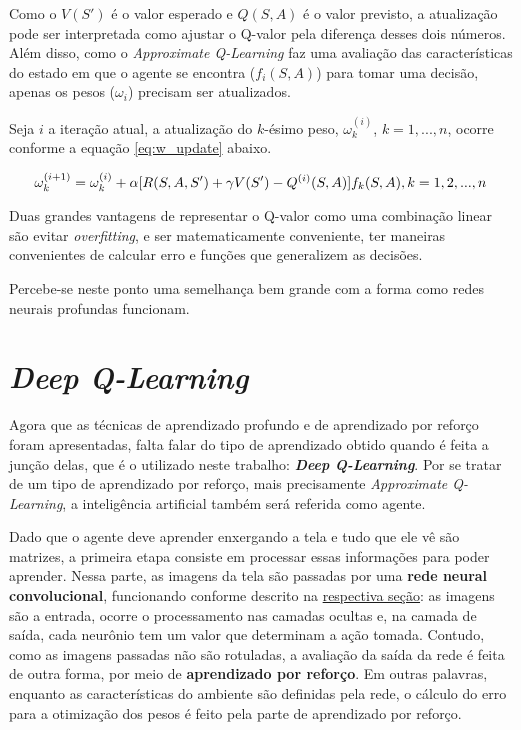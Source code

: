 Como o $V(S')$ é o valor esperado e $Q(S,A)$ é o valor previsto, a atualização pode ser interpretada como ajustar o Q-valor pela diferença desses dois números.
Além disso, como o \textit{Approximate Q-Learning} faz uma avaliação das características do estado em que o agente se encontra ($f_{i}(S,A)$) para tomar uma decisão, apenas os pesos ($\omega_{i}$) precisam ser atualizados.

Seja $i$ a iteração atual, a atualização do $k$-ésimo peso, $\omega_{k}^{(i)}$, $k = 1, ..., n$, ocorre conforme a equação \ref{eq:w_update} abaixo.

\begin{equation} \label{eq:w_update}
\omega_{k}^{(i+1)} = \omega_{k}^{(i)} + \alpha[R(S,A,S') + \gamma V(S') - Q^{(i)}(S,A)]f_{k}(S,A), \hfill k = 1, 2, ..., n
\end{equation}

Duas grandes vantagens de representar o Q-valor como uma combinação linear são evitar \textit{overfitting}, e ser matematicamente conveniente, ter maneiras convenientes de calcular erro e funções que generalizem as decisões.

Percebe-se neste ponto uma semelhança bem grande com a forma como redes neurais profundas funcionam.


\section{\textit{Deep Q-Learning}}
\label{sec:dql}

Agora que as técnicas de aprendizado profundo e de aprendizado por reforço foram apresentadas, falta falar do tipo de aprendizado obtido quando é feita a junção delas, que é o utilizado neste trabalho: \textit{\textbf{Deep Q-Learning}}.
Por se tratar de um tipo de aprendizado por reforço, mais precisamente \textit{Approximate Q-Learning}, a inteligência artificial também será referida como agente.

Dado que o agente deve aprender enxergando a tela e tudo que ele vê são matrizes, a primeira etapa consiste em processar essas informações para poder aprender.
Nessa parte, as imagens da tela são passadas por uma \textbf{rede neural convolucional}, funcionando conforme descrito na \hyperref[sec:cnn]{respectiva seção}: as imagens são a entrada, ocorre o processamento nas camadas ocultas e, na camada de saída, cada neurônio tem um valor que determinam a ação tomada.
Contudo, como as imagens passadas não são rotuladas, a avaliação da saída da rede é feita de outra forma, por meio de \textbf{aprendizado por reforço}.
Em outras palavras, enquanto as características do ambiente são definidas pela rede, o cálculo do erro para a otimização dos pesos é feito pela parte de aprendizado por reforço.

